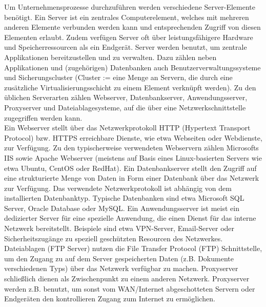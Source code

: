 Um Unternehmensprozesse durchzuführen werden verschiedene Server-Elemente benötigt. Ein Server ist ein zentrales Computerelement, welches mit mehreren anderen Elemente verbunden werden kann und entsprechenden Zugriff von diesen Elementen erlaubt. Zudem verfügen Server oft über leistungsfähigere Hardware und Speicherressourcen als ein Endgerät. Server werden benutzt, um zentrale Applikationen bereitzustellen und zu verwalten. Dazu zählen neben Applikationen und (zugehörigen) Datenbanken auch Benutzerverwaltungssysteme und Sicherungscluster (Cluster := eine Menge an Servern, die durch eine zusätzliche Virtualisierungsschicht zu einem Element verknüpft werden). Zu den üblichen Serverarten zählen Webserver, Datenbankserver, Anwendungsserver, Proxyserver und Dateiablagesysteme, auf die über eine Netzwerkschnittstelle zugegriffen werden kann.\\ 

Ein Webserver stellt über das Netzwerkprotokoll HTTP (Hypertext Transport Protocol) bzw. HTTPS erreichbare Dienste, wie etwa Webseiten oder Webdienste, zur Verfügung. Zu den typischerweise verwendeten Webservern zählen Microsofts IIS sowie Apache Webserver (meistens auf Basis eines Linux-basierten Servers wie etwa Ubuntu, CentOS oder RedHat). 
Ein Datenbankserver stellt den Zugriff auf eine strukturierte Menge von Daten in Form einer Datenbank über das Netzwerk zur Verfügung. Das verwendete Netzwerkprotokoll ist abhängig von dem installierten Datenbanktyp. Typische Datenbanken sind etwa Microsoft SQL Server, Oracle Database oder MySQL. 
Ein Anwendungsserver ist meist ein dedizierter Server für eine spezielle Anwendung, die einen Dienst für das interne Netzwerk bereitstellt. Beispiele sind etwa VPN-Server, Email-Server oder Sicherheitszugänge zu speziell geschützten Resourcen des Netzwerkes.
Dateiablagen (FTP Server) nutzen die File Transfer Protocol (FTP) Schnittstelle, um den Zugang zu auf dem Server gespeicherten Daten (z.B. Dokumente verschiedenen Typs) über das Netzwerk verfügbar zu machen. 
Proxyserver schließlich dienen als Zwischenpunkt zu einem anderen Netzwerk. Proxyserver werden z.B. benutzt, um sonst vom WAN/Internet abgeschotteten Servern oder Endgeräten den kontrollieren Zugang zum Internet zu ermöglichen.\\ 

